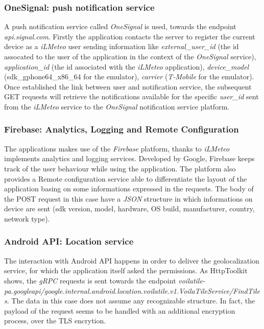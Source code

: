 			\subsubsection{OneSignal: push notification service}
				\par A push notification service called \textit{OneSignal} is used, towards the endpoint \textit{api.signal.com}. Firstly the application contacts the server to register the current device as a \textit{iLMeteo} user sending information like \textit{external\_user\_id} (the id assocated to the user of the application in the context of the \textit{OneSignal} service), \textit{application\_id} (the id associated with the \textit{iLMeteo} application), \textit{device\_model} (sdk\_gphone64\_x86\_64 for the emulator), \textit{carrier} (\textit{T-Mobile} for the emulator). Once established the link between user and notification service, the subsequent GET requests will retrieve the notifications available for the specific \textit{user\_id} sent from the \textit{iLMeteo} service to the \textit{OneSignal} notification service platform.
			
			\subsubsection{Firebase: Analytics, Logging and Remote Configuration}
				\par The applications makes use of the \textit{Firebase} platform, thanks to \textit{iLMeteo} implements analytics and logging services. Developed by Google, Firebase keeps track of the user behaviour while using the application. The platform also provides a Remote configuration service able to differentiate the layout of the application basing on some informations expressed in the requests. The body of the POST request in this case have a \textit{JSON} structure in which informations on device are sent (sdk version, model, hardware, OS build, manufacturer, country, network type).
			
			\subsubsection{Android API: Location service}
				\par The interaction with Android API happens in order to deliver the geolocalization service, for which the application itself asked the permissions. As HttpToolkit shows, the \textit{gRPC} requests is sent towards the endpoint \textit{voilatile-pa.googleapi/google.internal.android.location.voilatile.v1.VoilaTileService/FindTiles}. The data in this case does not assume any recognizable structure. In fact, the payload of the request seems to be handled with an additional encryption process, over the TLS encrytion. 
				
